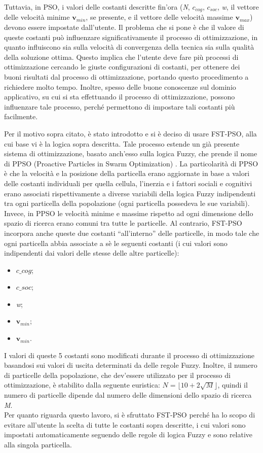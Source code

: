 Tuttavia, in PSO, i valori delle costanti descritte fin'ora (\textit{N}, $c_{cog}$, $c_{soc}$, \textit{w}, il vettore delle velocità minime $\textbf{v}_{min}$, se presente, e il vettore delle velocità massime $\textbf{v}_{max}$) devono essere impostate dall'utente. 
Il problema che si pone è che il valore di queste costanti può influenzare significativamente il processo di ottimizzazione, in quanto influiscono sia sulla velocità di convergenza della tecnica sia sulla qualità della soluzione ottima. 
Questo implica che l'utente deve fare più processi di ottimizzazione cercando le giuste configurazioni di costanti, per ottenere dei buoni risultati dal processo di ottimizzazione, portando questo procedimento a richiedere molto tempo. 
Inoltre, spesso delle buone conoscenze sul dominio applicativo, su cui si sta effettuando il processo di ottimizzazione, possono influenzare tale processo, perché permettono di impostare tali costanti più facilmente.

Per il motivo sopra citato, è stato introdotto e si è deciso di usare FST-PSO, alla cui base vi è la logica sopra descritta. 
Tale processo estende un già presente sistema di ottimizzazione, basato anch'esso sulla logica Fuzzy, che prende il nome di PPSO (Proactive Particles in Swarm Optimization) \cite{nobile2015}. 
La particolarità di PPSO è che la velocità e la posizione della particella erano aggiornate in base a valori delle costanti individuali per quella cellula, l'inerzia e i fattori sociali e cognitivi erano associati rispettivamente a diverse variabili della logica Fuzzy indipendenti tra ogni particella della popolazione (ogni particella possedeva le sue variabili). 
Invece, in PPSO le velocità minime e massime rispetto ad ogni dimensione dello spazio di ricerca erano comuni tra tutte le particelle. 
Al contrario, FST-PSO incorpora anche queste due costanti “all'interno” delle particelle, in modo tale che ogni particella abbia associate a sè le seguenti costanti (i cui valori sono indipendenti dai valori delle stesse delle altre particelle): \begin{itemize}
	\item $c\_{cog}$;
	\item $c\_{soc}$;
	\item \textit{w};
	\item $\textbf{v}_{min}$;
	\item $\textbf{v}_{min}$.
\end{itemize}
I valori di queste 5 costanti sono modificati durante il processo di ottimizzazione basandosi sui valori di uscita determinati da delle regole Fuzzy. 
Inoltre, il numero di particelle della popolazione, che dev'essere utilizzato per il processo di ottimizzazione, è stabilito dalla seguente euristica: $\textit{N} = \lfloor10 + 2\sqrt{\textit{M}}\rfloor$, quindi il numero di particelle dipende dal numero delle dimensioni dello spazio di ricerca \textit{M}.\\
Per quanto riguarda questo lavoro, si è sfruttato FST-PSO perché ha lo scopo di evitare all'utente la scelta di tutte le costanti sopra descritte, i cui valori sono impostati automaticamente seguendo delle regole di logica Fuzzy e sono relative alla singola particella.


